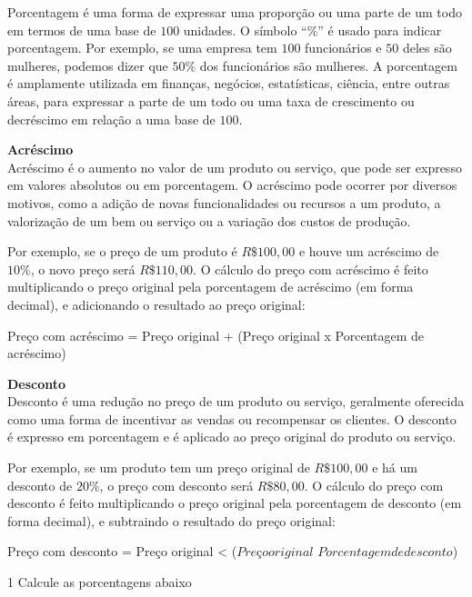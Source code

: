 {{\noindent Porcentagem é uma forma de expressar uma proporção ou uma parte de um
todo em termos de uma base de $100$ unidades. O símbolo ``\%'' é usado
para indicar porcentagem. Por exemplo, se uma empresa tem $100$
funcionários e $50$ deles são mulheres, podemos dizer que $50\%$ dos
funcionários são mulheres. A porcentagem é amplamente utilizada em
finanças, negócios, estatísticas, ciência, entre outras áreas, para
expressar a parte de um todo ou uma taxa de crescimento ou decréscimo em
relação a uma base de $100$.

\textbf{Acréscimo}\\

\noindent Acréscimo é o aumento no valor de um produto ou serviço, que pode ser
expresso em valores absolutos ou em porcentagem. O acréscimo pode
ocorrer por diversos motivos, como a adição de novas funcionalidades ou
recursos a um produto, a valorização de um bem ou serviço ou a variação
dos custos de produção.

Por exemplo, se o preço de um produto é $R\$100,00$ e houve um acréscimo
de $10\%$, o novo preço será $R\$110,00$. O cálculo do preço com acréscimo é
feito multiplicando o preço original pela porcentagem de acréscimo (em
forma decimal), e adicionando o resultado ao preço original:

Preço com acréscimo = Preço original + (Preço original x Porcentagem de
acréscimo)

\textbf{Desconto}\\

\noindent Desconto é uma redução no preço de um produto ou serviço, geralmente
oferecida como uma forma de incentivar as vendas ou recompensar os
clientes. O desconto é expresso em porcentagem e é aplicado ao preço
original do produto ou serviço.

Por exemplo, se um produto tem um preço original de $R\$100,00$ e há um
desconto de $20\%$, o preço com desconto será $R\$80,00$. O cálculo do preço
com desconto é feito multiplicando o preço original pela porcentagem de
desconto (em forma decimal), e subtraindo o resultado do preço original:

Preço com desconto = Preço original \textless{} ($Preço original$ \times $Porcentagem de desconto$)}


\num{1}  Calcule as porcentagens abaixo

}
